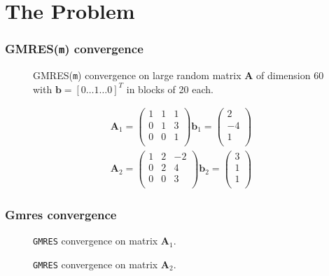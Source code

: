 \section{The Problem}
\begin{frame}
  \frametitle{GMRES(\texttt{m}) convergence}
	\begin{figure}
		
		\caption{GMRES(\texttt{m}) convergence on large random matrix $\mathbf{A}$ of dimension 60 with $\mathbf{b} = [0 \dots 1 \dots 0]^T$ in blocks of 20 each.}
    \end{figure}
  
\end{frame}



\begin{frame}
\begin{eqnarray}
\mathbf{A}_1 =
\begin{pmatrix}
1 & 1 & 1 \\
0 & 1 & 3 \\
0 & 0 & 1 \\
\end{pmatrix}
\mathbf{b}_1 =
\begin{pmatrix}
2 \\ -4 \\ 1 \\
\end{pmatrix} \\
\mathbf{A}_2 =
\begin{pmatrix}
1 & 2 & -2 \\
0 & 2 & 4 \\
0 & 0 & 3 \\
\end{pmatrix}
\mathbf{b}_2 =
\begin{pmatrix}
3 \\ 1 \\ 1 \\
\end{pmatrix}
\end{eqnarray}
\end{frame}


\begin{frame}
	\frametitle{Gmres convergence}	
	\begin{figure}
		
		\caption{\texttt{GMRES} convergence on matrix $\mathbf{A}_1. $}
    \end{figure}
\end{frame}

\begin{frame}
	\begin{figure}
			
			\caption{\texttt{GMRES} convergence on matrix $\mathbf{A}_2$.}
	\end{figure}
\end{frame}



